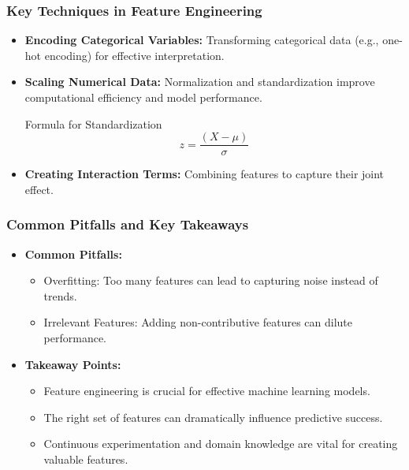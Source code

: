 \documentclass[aspectratio=169]{beamer}
\begin{document}
\begin{frame}[fragile]
    \frametitle{Key Techniques in Feature Engineering}
    \begin{itemize}
        \item \textbf{Encoding Categorical Variables:} Transforming categorical data (e.g., one-hot encoding) for effective interpretation.
        \item \textbf{Scaling Numerical Data:} Normalization and standardization improve computational efficiency and model performance.
        
        \begin{block}{Formula for Standardization}
            \begin{equation}
                z = \frac{(X - \mu)}{\sigma}
            \end{equation}
        \end{block}
        
        \item \textbf{Creating Interaction Terms:} Combining features to capture their joint effect.
    \end{itemize}
\end{frame}

\begin{frame}[fragile]
    \frametitle{Common Pitfalls and Key Takeaways}
    \begin{itemize}
        \item \textbf{Common Pitfalls:}
        \begin{itemize}
            \item Overfitting: Too many features can lead to capturing noise instead of trends.
            \item Irrelevant Features: Adding non-contributive features can dilute performance.
        \end{itemize}
        
        \item \textbf{Takeaway Points:}
        \begin{itemize}
            \item Feature engineering is crucial for effective machine learning models.
            \item The right set of features can dramatically influence predictive success.
            \item Continuous experimentation and domain knowledge are vital for creating valuable features.
        \end{itemize}
    \end{itemize}
\end{frame}
\end{document}
